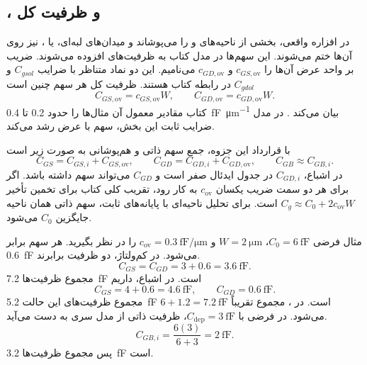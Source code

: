 \subsection{،  و ظرفیت کل}
در افزاره واقعی،  بخشی از ناحیه‌های  و  را
می‌پوشاند و میدان‌های لبه‌ای، یا ، نیز روی آن‌ها ختم می‌شوند.
این سهم‌ها در مدل کتاب به ظرفیت‌های  افزوده می‌شوند.
ضریب بر واحد عرض آن‌ها را \(c_{GS,\mathrm{ov}}\) و
\(c_{GD,\mathrm{ov}}\) می‌نامیم. این دو نماد متناظر با ضرایب
\(C_{gsol}\) و \(C_{gdol}\) در رابطه  کتاب هستند.
ظرفیت کل هر سهم چنین است
\begin{equation}
 C_{GS,\mathrm{ov}}=c_{GS,\mathrm{ov}}W,\qquad
 C_{GD,\mathrm{ov}}=c_{GD,\mathrm{ov}}W.
 \label{eq:cv-overlap}
\end{equation}
کتاب مقادیر معمول آن مثال‌ها را حدود \num{0.2} تا
\qty{0.4}{\femto\farad\per\micro\metre} بیان می‌کند
\cite[صفحه ۷۱، شکل ]{weste}.
در مدل ضرایب ثابت این بخش، سهم  با عرض رشد می‌کند.

با قرارداد این جزوه، جمع سهم ذاتی و هم‌پوشانی به صورت زیر است
\begin{equation}
 C_{GS}=C_{GS,i}+C_{GS,\mathrm{ov}},\qquad
 C_{GD}=C_{GD,i}+C_{GD,\mathrm{ov}},\qquad
 C_{GB}\approx C_{GB,i}.
 \label{eq:cv-total-components}
\end{equation}
در اشباع، \(C_{GD,i}\) در جدول ایدئال صفر است و \(C_{GD}\) می‌تواند سهم
 داشته باشد. اگر برای هر دو سمت ضریب یکسان \(c_{\mathrm{ov}}\)
به کار رود، تقریب کلی کتاب برای تخمین تأخیر
\(C_g\approx C_0+2c_{\mathrm{ov}}W\) است.
برای تحلیل ناحیه‌ای با پایانه‌های ثابت، سهم ذاتی همان ناحیه جایگزین \(C_0\) می‌شود.

مثال فرضی \(C_0=\qty{6}{\femto\farad}\)، \(W=\qty{2}{\micro\metre}\)
و \(c_{\mathrm{ov}}=\qty{0.3}{\femto\farad\per\micro\metre}\) را در نظر بگیرید.
هر سهم  برابر \qty{0.6}{\femto\farad} می‌شود.
در  کم‌ولتاژ، دو ظرفیت برابرند.
\[
 C_{GS}=C_{GD}=3+0.6=\qty{3.6}{\femto\farad}.
\]
مجموع ظرفیت‌ها \qty{7.2}{\femto\farad} است. در اشباع، داریم
\[
 C_{GS}=4+0.6=\qty{4.6}{\femto\farad},\qquad
 C_{GD}=\qty{0.6}{\femto\farad}.
\]
مجموع ظرفیت‌های این حالت \qty{5.2}{\femto\farad} است.
در ، مجموع تقریباً \(6+1.2=\qty{7.2}{\femto\farad}\) می‌شود.
در  فرضی با \(C_{\mathrm{dep}}=\qty{3}{\femto\farad}\)،
ظرفیت ذاتی از مدل سری به دست می‌آید.
\[
 C_{GB,i}=\frac{6(3)}{6+3}=\qty{2}{\femto\farad}.
\]
پس مجموع ظرفیت‌ها \qty{3.2}{\femto\farad} است.

